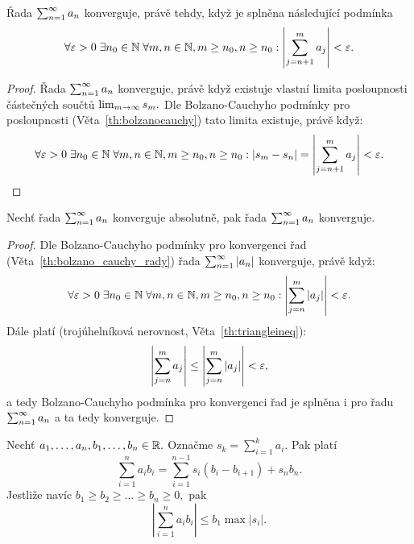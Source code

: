 \begin{theorem}
    \label{th:bolzano_cauchy_rady}
    Řada $\sum_{n=1}^\infty a_n$ konverguje, právě tehdy, když je splněna následující
    podmínka
    $$\forall \varepsilon > 0 \; \exists n_0 \in \mathbb{N} \; \forall m,n \in \mathbb{N}, m\geq n_0, n\geq n_0:
    \left|\sum_{j=n+1}^m a_j \right| < \varepsilon.$$
\end{theorem}

\begin{proof}
    Řada $\sum_{n=1}^\infty a_n$ konverguje, právě když existuje vlastní limita posloupnosti
    částečných součtů $\lim_{m \to \infty} s_m.$ Dle Bolzano-Cauchyho podmínky pro
    posloupnosti (Věta~\ref{th:bolzanocauchy}) tato limita existuje,
    právě když:
    $$\forall \varepsilon > 0 \; \exists n_0 \in \mathbb{N} \; \forall m,n \in \mathbb{N}, m \geq n_0, 
    n \geq n_0: |s_m - s_n| = \left|\sum_{j=n+1}^m a_j \right|  < \varepsilon.$$
\end{proof}

\begin{theorem}
    Nechť řada $\sum_{n=1}^\infty a_n$ konverguje absolutně, pak řada $\sum_{n=1}^\infty a_n$
    konverguje.
\end{theorem}

\begin{proof}
    Dle Bolzano-Cauchyho podmínky pro konvergenci řad 
    (Věta~\ref{th:bolzano_cauchy_rady}) řada $\sum_{n=1}^\infty |a_n|$ konverguje, 
    právě když:
    $$\forall \varepsilon > 0 \; \exists n_0 \in \mathbb{N} \; \forall m,n \in \mathbb{N}, m\geq n_0, n\geq n_0:
        \left|\sum_{j=n}^m |a_j| \right| < \varepsilon.$$
    Dále platí (trojúhelníková nerovnost, Věta~\ref{th:triangleineq}):
    $$ \left|\sum_{j=n}^m a_j \right| \leq \left|\sum_{j=n}^m |a_j| \right| < \varepsilon,$$
    a tedy Bolzano-Cauchyho podmínka pro konvergenci řad je splněna i pro 
    řadu $\sum_{n=1}^\infty a_n$ a ta tedy konverguje.
\end{proof}

\begin{lemma}
    \label{lm:abelova_parcialni_sumace}
    Nechť $a_1,\dots,a_n, b_1, \dots, b_n \in \mathbb{R}.$ Označme $s_k = \sum_{i=1}^k a_i.$
    Pak platí
    $$\sum_{i=1}^n a_ib_i = \sum_{i=1}^{n-1} s_i(b_i-b_{i+1}) + s_nb_n.$$
    Jestliže navíc $b_1 \geq b_2 \geq \dots \geq b_n \geq 0,$ pak
    $$\left|\sum_{i=1}^n a_ib_i\right|\leq b_1 \max |s_i|.$$
\end{lemma}

